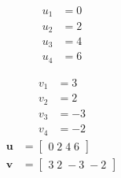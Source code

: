\[\begin{aligned}
u_{1} &= 0 \\
u_{2} &= 2 \\
u_{3} &= 4 \\
u_{4} &= 6 
\end{aligned}\]

\[\begin{aligned}
v_{1} &= 3 \\
v_{2} &= 2 \\
v_{3} &= -3 \\
v_{4} &= -2 
\end{aligned}\]
\[\begin{aligned}
\mathbf{u} &= \begin{bmatrix}0\;2\;4\;6\end{bmatrix} \\
\mathbf{v} &= \begin{bmatrix}3\;2\;-3\;-2\end{bmatrix}
\end{aligned}\]

